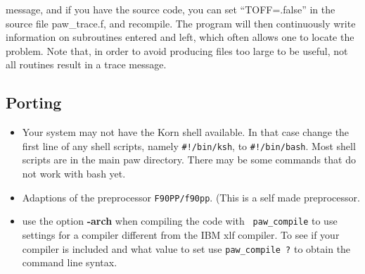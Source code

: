 \documentclass[final,12pt]{article}
\begin{document}
\begin{enumerate}
  message, and if you have the source code, you can set
  ``TOFF=.false'' in the source file paw\_trace.f, and recompile. The
  program will then continuously write information on subroutines
  entered and left, which often allows one to locate the problem. Note that, in
  order to avoid producing files too large to be useful, not all
  routines result in a trace message.   %
\end{enumerate}

\subsection{Porting}
\begin{itemize}
\item Your system may not have the Korn shell available. In that case
  change the first line of any shell scripts, namely {\tt \#!/bin/ksh}, to
    {\tt \#!/bin/bash}. Most shell scripts are in the main paw directory.
   There may be some commands that do not work with bash yet.
\item Adaptions of the preprocessor {\tt F90PP/f90pp}. (This is a self
  made preprocessor.
\item use the option {\bf -arch} when compiling the code with {\tt
    paw\_compile} to use settings for a compiler different from the
  IBM xlf compiler. To see if your compiler is included and what value
  to set use {\tt paw\_compile ?} to obtain the command line syntax.
\end{itemize}
\end{document}
